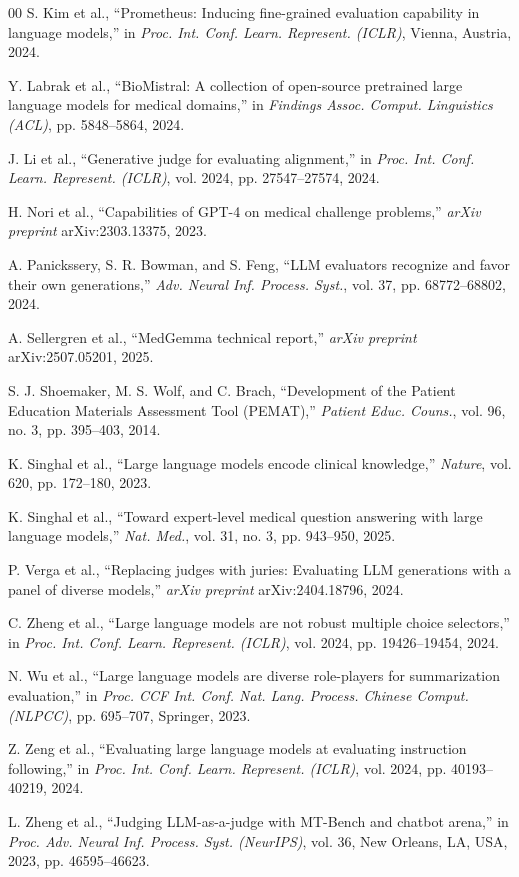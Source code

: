 \documentclass[conference]{IEEEtran}
\begin{document}
\begin{thebibliography}{00}
S. Kim et al., ``Prometheus: Inducing fine-grained evaluation capability
in language models,'' in \textit{Proc. Int. Conf. Learn. Represent.
(ICLR)}, Vienna, Austria, 2024.

Y. Labrak et al., ``BioMistral: A collection of open-source pretrained
large language models for medical domains,'' in \textit{Findings Assoc.
Comput. Linguistics (ACL)}, pp. 5848--5864, 2024.

J. Li et al., ``Generative judge for evaluating alignment,''
in \textit{Proc. Int. Conf. Learn. Represent. (ICLR)},
vol. 2024, pp. 27547--27574, 2024.

H. Nori et al., ``Capabilities of GPT-4 on medical challenge problems,''
\textit{arXiv preprint} arXiv:2303.13375, 2023.

A. Panickssery, S. R. Bowman, and S. Feng, ``LLM evaluators recognize
and favor their own generations,'' \textit{Adv. Neural Inf. Process. Syst.},
vol. 37, pp. 68772--68802, 2024.

A. Sellergren et al., ``MedGemma technical report,'' \textit{arXiv
preprint} arXiv:2507.05201, 2025.

S. J. Shoemaker, M. S. Wolf, and C. Brach, ``Development of the Patient
Education Materials Assessment Tool (PEMAT),'' \textit{Patient Educ.
Couns.}, vol. 96, no. 3, pp. 395--403, 2014.

K. Singhal et al., ``Large language models encode clinical knowledge,''
\textit{Nature}, vol. 620, pp. 172--180, 2023.

K. Singhal et al., ``Toward expert-level medical question answering
with large language models,'' \textit{Nat. Med.}, vol. 31, no. 3,
pp. 943--950, 2025.

P. Verga et al., ``Replacing judges with juries: Evaluating LLM
generations with a panel of diverse models,'' \textit{arXiv preprint}
arXiv:2404.18796, 2024.

C. Zheng et al., ``Large language models are not robust multiple choice
selectors,'' in \textit{Proc. Int. Conf. Learn. Represent. (ICLR)},
vol. 2024, pp. 19426--19454, 2024.

N. Wu et al., ``Large language models are diverse role-players
for summarization evaluation,'' in \textit{Proc. CCF Int. Conf. Nat.
Lang. Process. Chinese Comput. (NLPCC)}, pp. 695--707, Springer, 2023.

Z. Zeng et al., ``Evaluating large language models at evaluating
instruction following,'' in \textit{Proc. Int. Conf. Learn. Represent.
(ICLR)}, vol. 2024, pp. 40193--40219, 2024.

L. Zheng et al., ``Judging LLM-as-a-judge with MT-Bench and chatbot
arena,'' in \textit{Proc. Adv. Neural Inf. Process. Syst. (NeurIPS)},
vol. 36, New Orleans, LA, USA, 2023, pp. 46595--46623.

\end{thebibliography}
\end{document}
